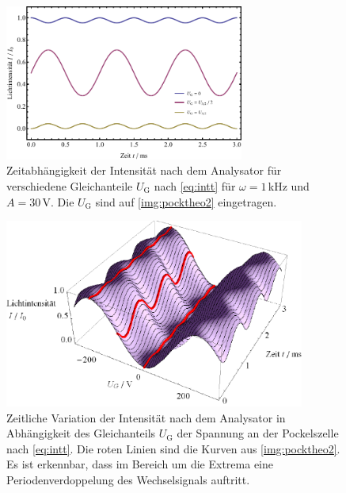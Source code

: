 \begin{figure}[H]
\begin{center}
  \includegraphics[width=0.7\textwidth]{../img/Pocktheo2.pdf}
  \caption{Zeitabhängigkeit der Intensität nach dem Analysator für verschiedene Gleichanteile $U_\text{G}$
  nach \autoref{eq:intt} für $\omega=1$\,kHz und $A=30$\,V.
  Die $U_\text{G}$ sind auf \autoref{img:pocktheo2} eingetragen.}
  \label{img:pocktheo2}
\end{center}
\end{figure}

\begin{figure}[H]
\begin{center}
  \includegraphics[width=0.88\textwidth]{../img/Pocktheo3.pdf}
  \caption{Zeitliche Variation der Intensität nach dem Analysator
  in Abhängigkeit des Gleichanteils $U_{\text{G}}$ der Spannung an der Pockelszelle nach \autoref{eq:intt}.
  Die roten Linien sind die Kurven aus \autoref{img:pocktheo2}.
  Es ist erkennbar, dass im Bereich um die Extrema eine Periodenverdoppelung des Wechselsignals auftritt.}
  \label{img:pocktheo3}
\end{center}
\end{figure}

